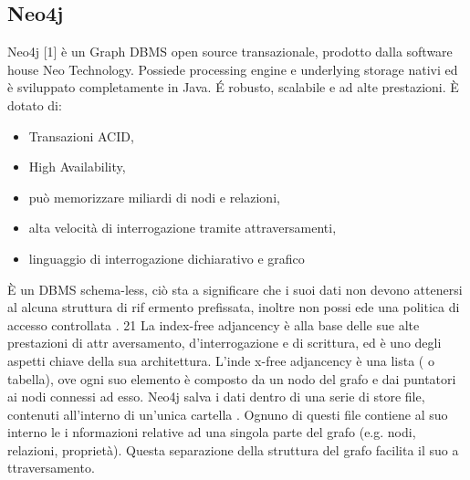 \subsection{Neo4j}
\label{sec:neo4j}
Neo4j [1] è un Graph DBMS open source transazionale, prodotto dalla
software house Neo Technology. Possiede processing engine e underlying
storage nativi ed è sviluppato completamente in Java. É robusto, scalabile
e ad alte prestazioni. È dotato di:
\begin{itemize}
\item Transazioni ACID,
\item High Availability,
\item può memorizzare miliardi di nodi e relazioni,
\item alta velocità di interrogazione tramite attraversamenti,
\item linguaggio di interrogazione dichiarativo e grafico
\end{itemize}
È un DBMS schema-less, ciò sta a significare che i suoi dati non devono
attenersi al alcuna struttura di rif ermento prefissata, inoltre non possi ede
una politica di accesso controllata .
21
La index-free adjancency è alla base delle sue alte prestazioni di attr aversamento,
d’interrogazione e di scrittura, ed è uno degli aspetti chiave
della sua architettura. L’inde x-free adjancency è una lista ( o tabella), ove
ogni suo elemento è composto da un nodo del grafo e dai puntatori ai nodi
connessi ad esso.
Neo4j salva i dati dentro di una serie di store file, contenuti all’interno
di un’unica cartella . Ognuno di questi file contiene al suo interno le i nformazioni
relative ad una singola parte del grafo (e.g. nodi, relazioni,
proprietà). Questa separazione della struttura del grafo facilita il suo a ttraversamento.


